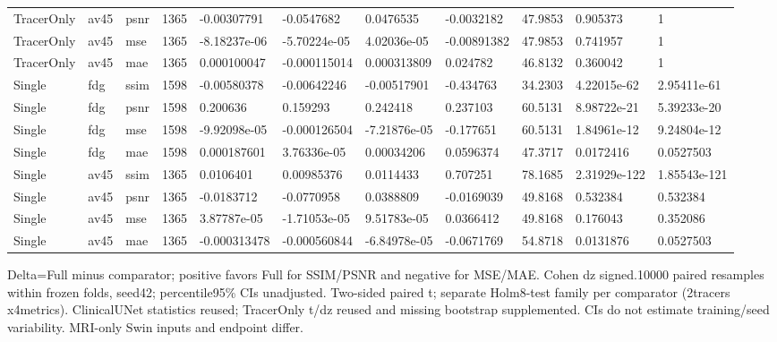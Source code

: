 \begin{landscape}
\begin{longtable}{lllllllllll}
TracerOnly & av45 & psnr & 1365 & -0.00307791 & -0.0547682 & 0.0476535 & -0.0032182 & 47.9853 & 0.905373 & 1 \\
TracerOnly & av45 & mse & 1365 & -8.18237e-06 & -5.70224e-05 & 4.02036e-05 & -0.00891382 & 47.9853 & 0.741957 & 1 \\
TracerOnly & av45 & mae & 1365 & 0.000100047 & -0.000115014 & 0.000313809 & 0.024782 & 46.8132 & 0.360042 & 1 \\
Single & fdg & ssim & 1598 & -0.00580378 & -0.00642246 & -0.00517901 & -0.434763 & 34.2303 & 4.22015e-62 & 2.95411e-61 \\
Single & fdg & psnr & 1598 & 0.200636 & 0.159293 & 0.242418 & 0.237103 & 60.5131 & 8.98722e-21 & 5.39233e-20 \\
Single & fdg & mse & 1598 & -9.92098e-05 & -0.000126504 & -7.21876e-05 & -0.177651 & 60.5131 & 1.84961e-12 & 9.24804e-12 \\
Single & fdg & mae & 1598 & 0.000187601 & 3.76336e-05 & 0.00034206 & 0.0596374 & 47.3717 & 0.0172416 & 0.0527503 \\
Single & av45 & ssim & 1365 & 0.0106401 & 0.00985376 & 0.0114433 & 0.707251 & 78.1685 & 2.31929e-122 & 1.85543e-121 \\
Single & av45 & psnr & 1365 & -0.0183712 & -0.0770958 & 0.0388809 & -0.0169039 & 49.8168 & 0.532384 & 0.532384 \\
Single & av45 & mse & 1365 & 3.87787e-05 & -1.71053e-05 & 9.51783e-05 & 0.0366412 & 49.8168 & 0.176043 & 0.352086 \\
Single & av45 & mae & 1365 & -0.000313478 & -0.000560844 & -6.84978e-05 & -0.0671769 & 54.8718 & 0.0131876 & 0.0527503 \\
\end{longtable}
\noindent\parbox{\linewidth}{\footnotesize Delta=Full minus comparator; positive favors Full for SSIM/PSNR and negative for MSE/MAE. Cohen dz signed.10000 paired resamples within frozen folds, seed42; percentile95\% CIs unadjusted. Two-sided paired t; separate Holm8-test family per comparator (2tracers x4metrics). ClinicalUNet statistics reused; TracerOnly t/dz reused and missing bootstrap supplemented. CIs do not estimate training/seed variability. MRI-only Swin inputs and endpoint differ.}
\endgroup
\end{landscape}
